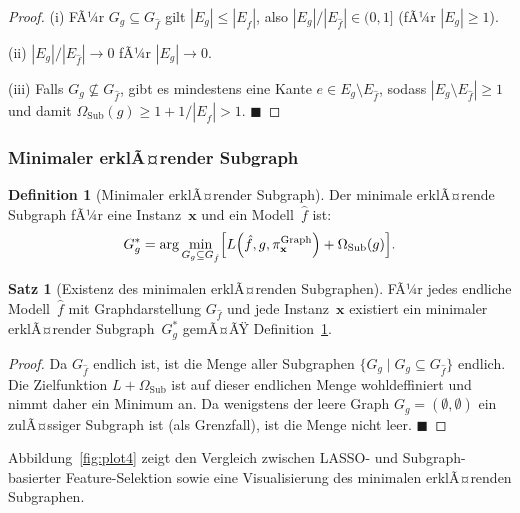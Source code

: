 ﻿\documentclass[a4paper,12pt]{article}
\theoremstyle{definition}
\newtheorem{definition}{Definition}[section]
\newtheorem{satz}{Satz}[section]
\begin{document}
\begin{proof}
  (i) FÃ¼r $G_g \subseteq G_{\hat{f}}$ gilt $|E_g| \leq |E_{\hat{f}}|$, also
  $|E_g|/|E_{\hat{f}}| \in (0, 1]$ (fÃ¼r $|E_g| \geq 1$).

  (ii) $|E_g| / |E_{\hat{f}}| \to 0$ fÃ¼r $|E_g| \to 0$.

  (iii) Falls $G_g \not\subseteq G_{\hat{f}}$, gibt es mindestens eine Kante
  $e \in E_g \setminus E_{\hat{f}}$, sodass $|E_g \setminus E_{\hat{f}}| \geq 1$
  und damit $\Omega_{\mathrm{Sub}}(g) \geq 1 + 1/|E_{\hat{f}}| > 1$. \hfill$\blacksquare$
\end{proof}

\subsubsection{Minimaler erklÃ¤render Subgraph}

\begin{definition}[Minimaler erklÃ¤render Subgraph]
  \label{def:min_subgraph}
  Der minimale erklÃ¤rende Subgraph fÃ¼r eine Instanz~$\mathbf{x}$ und ein
  Modell~$\hat{f}$ ist:
  \begin{equation}
    G^*_g = \arg\min_{\substack{G_g \subseteq G_{\hat{f}}}}
    \Bigl[
      L\!\left(\hat{f}, g, \pi_\mathbf{x}^{\mathrm{Graph}}\right) + \Omega_{\mathrm{Sub}}(g)
    \Bigr].
    \label{eq:min_subgraph}
  \end{equation}
\end{definition}

\begin{satz}[Existenz des minimalen erklÃ¤renden Subgraphen]
  FÃ¼r jedes endliche Modell~$\hat{f}$ mit Graphdarstellung $G_{\hat{f}}$ und
  jede Instanz~$\mathbf{x}$ existiert ein minimaler erklÃ¤render Subgraph~$G^*_g$
  gemÃ¤ÃŸ Definition~\ref{def:min_subgraph}.
\end{satz}

\begin{proof}
  Da $G_{\hat{f}}$ endlich ist, ist die Menge aller Subgraphen
  $\{G_g \mid G_g \subseteq G_{\hat{f}}\}$ endlich.
  Die Zielfunktion $L + \Omega_{\mathrm{Sub}}$ ist auf dieser endlichen Menge
  wohldeffiniert und nimmt daher ein Minimum an.
  Da wenigstens der leere Graph $G_g = (\emptyset, \emptyset)$ ein zulÃ¤ssiger
  Subgraph ist (als Grenzfall), ist die Menge nicht leer. \hfill$\blacksquare$
\end{proof}

Abbildung~\ref{fig:plot4} zeigt den Vergleich zwischen LASSO- und Subgraph-basierter
Feature-Selektion sowie eine Visualisierung des minimalen erklÃ¤renden Subgraphen.
\end{document}
